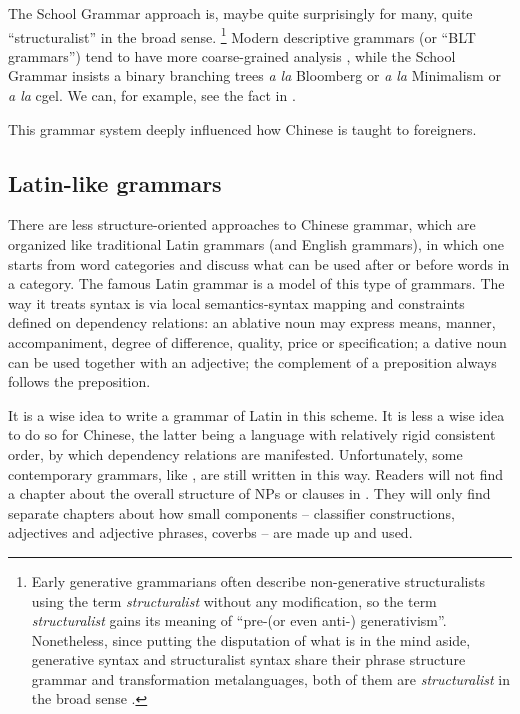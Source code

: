 The School Grammar approach is, maybe quite surprisingly for many, quite ``structuralist'' in the broad 
sense.%
\footnote{
    Early generative grammarians often describe non-generative structuralists using the term \emph{structuralist}
    without any modification, so the term \emph{structuralist} gains its meaning of ``pre-(or even anti-)
    generativism''. Nonetheless, since putting the disputation of what is in the mind aside, 
    generative syntax and structuralist syntax share their phrase structure grammar and transformation 
    metalanguages, both of them are \emph{structuralist} in the broad sense \citep{newmeyer1986has}.
}
Modern descriptive grammars (or ``BLT grammars'') tend to have more coarse-grained analysis \citep{dryer2006descriptive},
while the School Grammar insists a binary branching trees \emph{a la} Bloomberg or \emph{a la} Minimalism
or \emph{a la} \ac{cgel}. We can, for example, see the fact in .

This grammar system deeply influenced how Chinese is taught to foreigners. %

\subsection{Latin-like grammars}

There are less structure-oriented approaches to Chinese grammar, which are organized like traditional 
Latin grammars (and English grammars), in which one starts from word categories and discuss what can be 
used after or before words in a category. The famous Latin grammar \citet{greenough2013allen} is 
a model of this type of grammars. The way it treats syntax is via local semantics-syntax mapping 
and constraints defined on dependency relations: an ablative noun may express means, manner, 
accompaniment, degree of difference, quality, price or specification; a dative noun can be used 
together with an adjective; the complement of a preposition always follows the preposition.

It is a wise idea to write a grammar of Latin in this scheme. It is less a wise idea to do so for Chinese,
the latter being a language with relatively rigid consistent order, by which dependency relations 
are manifested. Unfortunately, some contemporary grammars, like \citet{po2015chinese}, are still 
written in this way. Readers will not find a chapter about the overall structure of NPs or clauses 
in \citet{po2015chinese}. They will only find separate chapters about how small components -- classifier
constructions, adjectives and adjective phrases, coverbs -- are made up and used.

